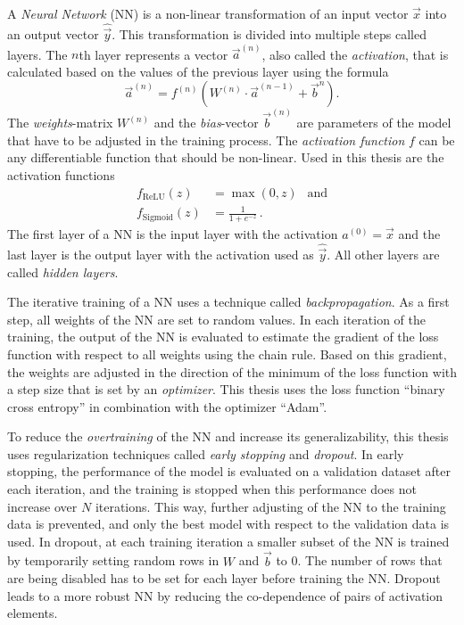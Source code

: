
A \emph{Neural Network} (NN) is a non-linear transformation of an input vector $\vec{x}$ into an output vector $\hat{\vec{y}}$.
This transformation is divided into multiple steps called layers.
The $n$th layer represents a vector $\vec{a}^{(n)}$, also called the \emph{activation}, that is calculated based on the values of the previous layer using the formula
\begin{equation*}
    \vec{a}^{(n)} = f^{(n)}\left( W^{(n)} \cdot \vec{a}^{(n-1)} + \vec{b}^{n} \right).
\end{equation*}
The \emph{weights}-matrix $W^{(n)}$ and the \emph{bias}-vector $\vec{b}^{(n)}$ are parameters of the model that have to be adjusted in the training process.
The \emph{activation function} $f$ can be any differentiable function that should be non-linear.
Used in this thesis are the activation functions
\begin{align*}
    f_\text{ReLU}(z) &= \max(0, z) \:\:\text{  and} \\
    f_\text{Sigmoid}(z) &= \frac{1}{1+e^{-z}} \, .
\end{align*}
The first layer of a NN is the input layer with the activation $a^{(0)}=\vec{x}$ and the last layer is the output layer with the activation used as $\hat{\vec{y}}$.
All other layers are called \emph{hidden layers}.

The iterative training of a NN uses a technique called \emph{backpropagation}.
As a first step, all weights of the NN are set to random values.
In each iteration of the training, the output of the NN is evaluated to estimate the gradient of the loss function with respect to all weights using the chain rule.
Based on this gradient, the weights are adjusted in the direction of the minimum of the loss function with a step size that is set by an \emph{optimizer}.
This thesis uses the loss function \enquote{binary cross entropy} in combination with the optimizer \enquote{Adam}\cite{adam}.

To reduce the \emph{overtraining} of the NN and increase its generalizability, this thesis uses regularization techniques called \emph{early stopping} and \emph{dropout}.
In early stopping, the performance of the model is evaluated on a validation dataset after each iteration, and the training is stopped when this performance does not increase over $N$ iterations.
This way, further adjusting of the NN to the training data is prevented, and only the best model with respect to the validation data is used.
In dropout, at each training iteration a smaller subset of the NN is trained by temporarily setting random rows in $W$ and $\vec{b}$ to 0.
The number of rows that are being disabled has to be set for each layer before training the NN.
Dropout leads to a more robust NN by reducing the co-dependence of pairs of activation elements.


